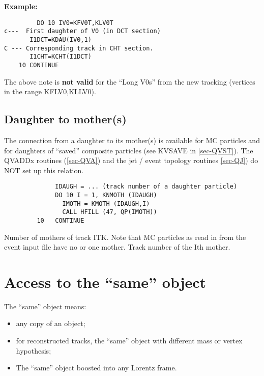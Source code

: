 {\bf Example:}
\begin{verbatim}
         DO 10 IV0=KFV0T,KLV0T
c---  First daughter of V0 (in DCT section)
       I1DCT=KDAU(IV0,1)
C --- Corresponding track in CHT section.
       I1CHT=KCHT(I1DCT)
    10 CONTINUE
\end{verbatim}

The above note is {\bf not valid} for the ``Long V0s'' from the new tracking
(vertices in the range KFLV0,KLLV0).
\par
\subsection{\label{sec-AMD}Daughter to mother(s)}
\par
The connection from a daughter to its mother(s) is available for MC
particles and for daughters of ``saved'' composite particles (see
KVSAVE
in \ref{sec-QVST}).
The QVADDx routines (\ref{sec-QVA}) and
the jet / event topology routines \ref{sec-QJ})
do NOT set up this relation.
\begin{verbatim}
              IDAUGH = ... (track number of a daughter particle)
              DO 10 I = 1, KNMOTH (IDAUGH)
                IMOTH = KMOTH (IDAUGH,I)
                CALL HFILL (47, QP(IMOTH))
         10   CONTINUE
\end{verbatim}
\begin{indentlist}{ 3.50cm}{ 3.75cm}
Number of mothers of track ITK. Note that MC particles
as read in from the event input file have no or one mother.
Track number of the Ith mother.
\end{indentlist}
\section{\label{sec-AS}Access to the ``same'' object}
\par
The ``same'' object means:
\begin{itemize}
\item any copy of an object;
\item for reconstructed tracks, the ``same'' object with different
mass or
vertex hypothesis;
\item The ``same'' object boosted into any Lorentz frame.
\end{itemize}
